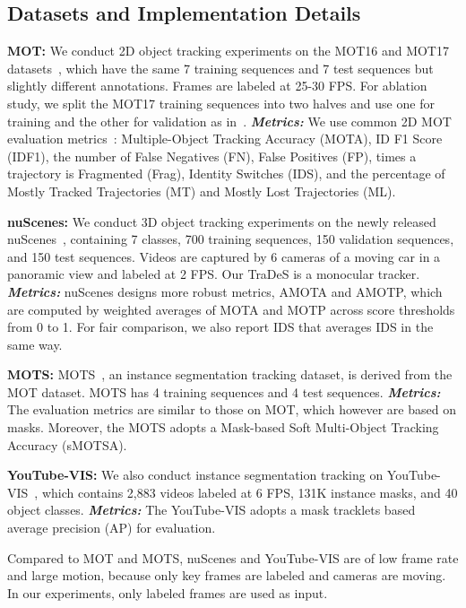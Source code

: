 \documentclass[final]{cvpr}
\newcommand{\myparagraph}[1]{{\vspace{0.5em} \noindent \bf #1}}
\begin{document}
\subsection{Datasets and Implementation Details}
\label{subsec:dataset_implement_details}
\myparagraph{MOT:} We conduct 2D object tracking experiments on the MOT16 and MOT17 datasets~\cite{milan1603mot16}, which have the same 7 training sequences and 7 test sequences but slightly different annotations. Frames are labeled at 25-30 FPS. For ablation study, we split the MOT17 training sequences into two halves and use one for training and the other for validation as in~\cite{CenterTrack}. \textbf{\emph{Metrics:}} We use common 2D MOT evaluation metrics~\cite{bernardin2008evaluating}: Multiple-Object Tracking Accuracy (MOTA), ID F1 Score (IDF1), the number of False Negatives (FN), False Positives (FP), times a trajectory is Fragmented (Frag), Identity Switches (IDS), and the percentage of Mostly Tracked Trajectories (MT) and Mostly Lost Trajectories (ML).

\myparagraph{nuScenes:} We conduct 3D object tracking experiments on the newly released nuScenes~\cite{caesar2020nuscenes}, containing 7 classes, 700 training sequences, 150 validation sequences,
and 150 test sequences. Videos are captured by 6 cameras of a moving car in a panoramic view and labeled at 2 FPS. Our TraDeS is a monocular tracker. \textbf{\emph{Metrics:}} nuScenes designs more robust metrics, AMOTA and AMOTP, which are computed by weighted averages of MOTA and MOTP across score thresholds from 0 to 1. For fair comparison, we also report IDS that averages IDS in the same way. 

\myparagraph{MOTS:} MOTS~\cite{mots_dataset}, an instance segmentation tracking dataset, is derived from the MOT dataset. MOTS has 4 training sequences and 4 test sequences. \textbf{\emph{Metrics:}} The evaluation metrics are similar to those on MOT, which however are based on masks. Moreover, the MOTS adopts a Mask-based Soft Multi-Object Tracking Accuracy (sMOTSA).

\myparagraph{YouTube-VIS:} We also conduct instance segmentation tracking on YouTube-VIS~\cite{yang2019video}, which contains 2,883 videos labeled at 6 FPS, 131K instance masks, and 40 object classes. \textbf{\emph{Metrics:}} The YouTube-VIS adopts a mask tracklets based average precision (AP) for evaluation.

Compared to MOT and MOTS, nuScenes and YouTube-VIS are of low frame rate and large motion, because only key frames are labeled and cameras are moving. In our experiments, only labeled frames are used as input.
\end{document}
